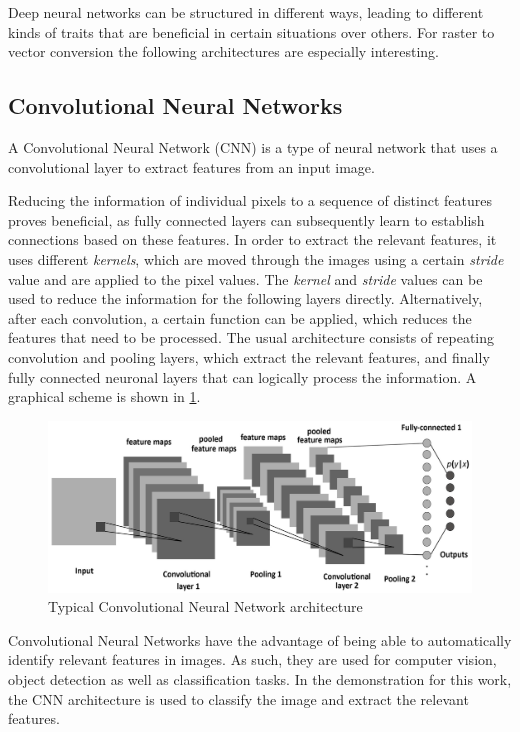 \documentclass[12pt, a4paper, titlepage]{report}
\begin{document}
Deep neural networks can be structured in different ways, leading to different kinds of traits that are beneficial in certain situations over others. For raster to vector conversion the following architectures are especially interesting.

\subsection{Convolutional Neural Networks}

A Convolutional Neural Network (CNN) is a type of neural network that uses a convolutional layer to extract features from an input image. 

Reducing the information of individual pixels to a sequence of distinct features proves beneficial, as fully connected layers can subsequently learn to establish connections based on these features. In order to extract the relevant features, it uses different \emph{kernels}, which are moved through the images using a certain \emph{stride} value and are applied to the pixel values. The \emph{kernel} and \emph{stride} values can be used to reduce the information for the following layers directly. Alternatively, after each convolution, a certain function can be applied, which reduces the features that need to be processed. The usual architecture consists of repeating convolution and pooling layers, which extract the relevant features, and finally fully connected neuronal layers that can logically process the information. A graphical scheme is shown in \ref{fig:cnn_architecture}.

\begin{figure}
	\centering
	\includegraphics[width=1.0\textwidth]{../rc/images/cnn_architecture.png}
   \caption{Typical Convolutional Neural Network architecture \cite{img_cnn_architecture}}
	\label{fig:cnn_architecture}
\end{figure}


Convolutional Neural Networks have the advantage of being able to automatically identify relevant features in images. As such, they are used for computer vision, object detection as well as classification tasks. In the demonstration for this work, the CNN architecture is used to classify the image and extract the relevant features.
\end{document}
